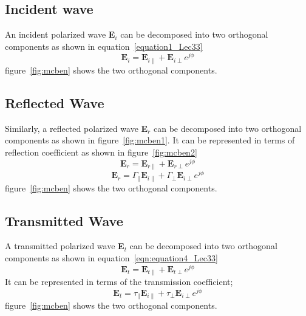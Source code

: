 \subsection{Incident wave}	
An incident polarized wave \textbf{E$_i$} can be decomposed into two orthogonal components as shown in equation~\ref{equation1_Lec33}	
\begin{equation}
\textbf{E}_i = \textbf{E}_{i\parallel} + \textbf{E}_{i\perp} e^{j\phi}
\label{equation1_Lec33}
\end{equation}
figure~\ref{fig:mcben} shows the two orthogonal components.	
\subsection{Reflected Wave}
Similarly, a reflected polarized wave \textbf{E$_r$} can be decomposed into two orthogonal components as shown in figure~\ref{fig:mcben1}. It can be represented in terms of reflection coefficient as shown in figure~\ref{fig:mcben2}
\begin{equation}
\textbf{E}_r = \textbf{E}_{r\parallel} + \textbf{E}_{r\perp} e^{j\phi}
\end{equation}	
\begin{equation}
\textbf{E}_r = \Gamma_\parallel \textbf{E}_{i\parallel} + \Gamma_\perp \textbf{E}_{i\perp} e^{j\phi}
\end{equation}	
figure~\ref{fig:mcben} shows the two orthogonal components.

\subsection{Transmitted Wave}
A transmitted polarized wave \textbf{E$_t$} can be decomposed into two orthogonal components as shown in equation~\ref{eqn:equation4_Lec33}
\begin{equation}
\textbf{E}_t = \textbf{E}_{t\parallel} + \textbf{E}_{t\perp} e^{j\phi}
\label{eqn:equation4_Lec33}
\end{equation}
It can be represented in terms of the transmission coefficient;	
\begin{equation}
\textbf{E}_t = \tau_\parallel \textbf{E}_{i\parallel} + \tau_\perp\textbf{E}_{i\perp} e^{j\phi}
\end{equation}	
figure~\ref{fig:mcben} shows the two orthogonal components.	

